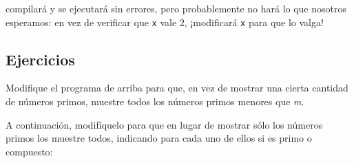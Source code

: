 compilará y se ejecutará sin errores, pero probablemente no hará lo que
nosotros esperamos: en vez de verificar que \lstinline!x! vale 2,
¡modificará \lstinline!x! para que lo valga!

\subsection{Ejercicios}

Modifique el programa de arriba para que, en vez de mostrar una cierta
cantidad de números primos, muestre todos los números primos menores que
\emph{m}.

A continuación, modifíquelo para que en lugar de mostrar sólo los
números primos los muestre todos, indicando para cada uno de ellos si es
primo o compuesto:
